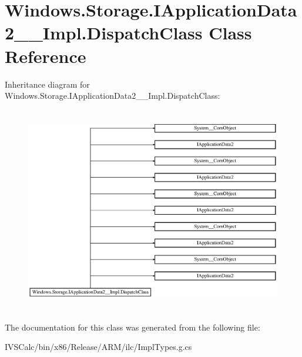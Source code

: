 \hypertarget{class_windows_1_1_storage_1_1_i_application_data2_____impl_1_1_dispatch_class}{}\section{Windows.\+Storage.\+I\+Application\+Data2\+\_\+\+\_\+\+Impl.\+Dispatch\+Class Class Reference}
\label{class_windows_1_1_storage_1_1_i_application_data2_____impl_1_1_dispatch_class}
Inheritance diagram for Windows.\+Storage.\+I\+Application\+Data2\+\_\+\+\_\+\+Impl.\+Dispatch\+Class\+:\begin{figure}[H]
\begin{center}
\leavevmode
\includegraphics[height=9.032259cm]{class_windows_1_1_storage_1_1_i_application_data2_____impl_1_1_dispatch_class}
\end{center}
\end{figure}


The documentation for this class was generated from the following file\+:\begin{DoxyCompactItemize}
\item 
I\+V\+S\+Calc/bin/x86/\+Release/\+A\+R\+M/ilc/Impl\+Types.\+g.\+cs\end{DoxyCompactItemize}
